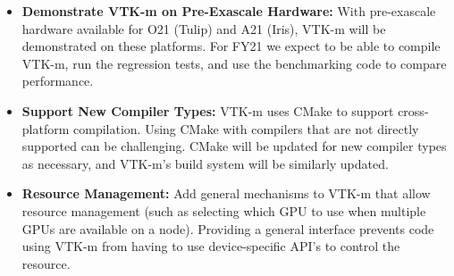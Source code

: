 \begin{itemize}
\item \textbf{Demonstrate VTK-m on Pre-Exascale Hardware:}
  With pre-exascale hardware available for O21 (Tulip) and A21 (Iris), VTK-m will be demonstrated on these platforms.
  For FY21 we expect to be able to compile VTK-m, run the regression tests, and use the benchmarking code to compare performance.
\item \textbf{Support New Compiler Types:}
  VTK-m uses CMake to support cross-platform compilation.
  Using CMake with compilers that are not directly supported can be challenging.
  CMake will be updated for new compiler types as necessary, and VTK-m's build system will be similarly updated.
\item \textbf{Resource Management:}
  Add general mechanisms to VTK-m that allow resource management (such as selecting which GPU to use when multiple GPUs are available on a node).
  Providing a general interface prevents code using VTK-m from having to use device-specific API's to control the resource.
\end{itemize}

